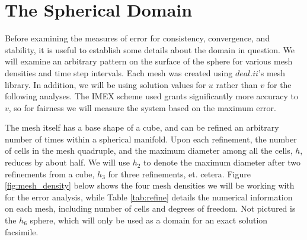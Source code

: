 \documentclass[12pt]{article}
\begin{document}
\section{The Spherical Domain}

Before examining the measures of error for consistency, convergence, and stability, it is useful to establish some details about the domain in question. We will examine an arbitrary pattern on the surface of the sphere for various mesh densities and time step intervals. Each mesh was created using $deal.ii$'s mesh library. In addition, we will be using solution values for $u$ rather than $v$ for the following analyses. The IMEX scheme used grants significantly more accuracy to $v$, so for fairness we will measure the system based on the maximum error.

The mesh itself has a base shape of a cube, and can be refined an arbitrary number of times within a spherical manifold. Upon each refinement, the number of cells in the mesh quadruple, and the maximum diameter among all the cells, $h$, reduces by about half. We will use $h_2$ to denote the maximum diameter after two refinements from a cube, $h_3$ for three refinements, et. cetera. Figure \ref{fig:mesh_density} below shows the four mesh densities we will be working with for the error analysis, while Table \ref{tab:refine} details the numerical information on each mesh, including number of cells and degrees of freedom. Not pictured is the $h_6$ sphere, which will only be used as a domain for an exact solution facsimile.
\end{document}
